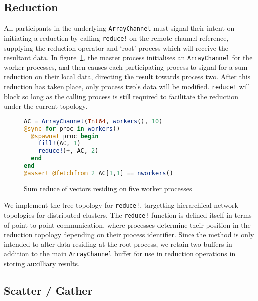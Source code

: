 \subsection{Reduction}
\label{sec:reduce}

All participants in the underlying \texttt{ArrayChannel} must signal
their intent on initiating a reduction by calling \texttt{reduce!} on
the remote channel reference, supplying the reduction operator and
`root' process which will receive the resultant data. In figure~\ref{code:reduce}, the master process initialises an
\texttt{ArrayChannel} for the worker processes, and then causes each
participating process to signal for a sum reduction on their local data,
directing the result towards process two. After this reduction has taken
place, only process two's data will be modified. \texttt{reduce!} will
block so long as the calling process is still required to facilitate the
reduction under the current topology.

\begin{figure}[htb]
  \begin{lstlisting}[language=Julia]
AC = ArrayChannel(Int64, workers(), 10)
@sync for proc in workers()
  @spawnat proc begin
    fill!(AC, 1)
    reduce!(+, AC, 2)
  end
end
@assert @fetchfrom 2 AC[1,1] == nworkers()
  \end{lstlisting}
  \caption{Sum reduce of vectors residing on five worker processes}
  \label{code:reduce}
\end{figure}

We implement the tree topology for \texttt{reduce!}, targetting
hierarchical network topologies for distributed clusters. The
\texttt{reduce!} function is defined itself in terms of point-to-point
communication, where processes determine their position in the reduction
topology depending on their process identifier. Since the method is only
intended to alter data residing at the root process, we retain two
buffers in addition to the main \texttt{ArrayChannel} buffer for use in
reduction operations in storing auxilliary results.

\subsection{Scatter / Gather}
\label{sec:scatter-gather}
